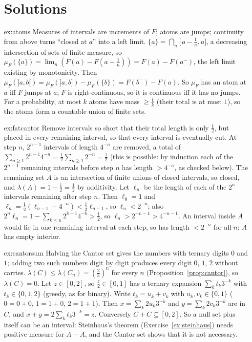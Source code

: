 \section{Solutions}

\begin{solution}{ex:atoms}
\idea Measures of intervals are increments of $F$; atoms are jumps; continuity from above turns ``closed at $a$'' into a left limit.
\writeup $\{a\}=\bigcap_n\,]a-\frac1n,a]$, a decreasing intersection of sets of finite measure, so $\mu_F(\{a\})=\lim_n(F(a)-F(a-\frac1n))=F(a)-F(a^-)$, the left limit existing by monotonicity.
Then $\mu_F(]a,b[)=\mu_F(]a,b])-\mu_F(\{b\})=F(b^-)-F(a)$. So $\mu_F$ has an atom at $a$ iff $F$ jumps at $a$; $F$ is right-continuous, so it is continuous iff it has no jumps. For a
probability, at most $k$ atoms have mass $\ge\frac1k$ (their total is at most $1$), so the atoms form a countable union of finite sets.
\end{solution}

\begin{solution}{ex:fatcantor}
\idea Remove intervals so short that their total length is only $\frac12$, but placed in every remaining interval, so that every interval is eventually cut.
\writeup At step $n$, $2^{n-1}$ intervals of length $4^{-n}$ are removed, a total of $\sum_{n\ge1}2^{n-1}4^{-n}=\frac12\sum_{n\ge1}2^{-n}=\frac12$ (this is possible: by induction each of the $2^{n-1}$ remaining
intervals before step $n$ has length $>4^{-n}$, as checked below). The remaining set $A$ is an intersection of finite unions of closed intervals, so closed, and $\lambda(A)=1-\frac12=\frac12$
by additivity. Let $\ell_n$ be the length of each of the $2^n$ intervals remaining after step $n$. Then $\ell_0=1$ and $\ell_n=\frac12(\ell_{n-1}-4^{-n})<\frac12\ell_{n-1}$, so $\ell_n<2^{-n}$; also
$2^n\ell_n=1-\sum_{k\le n}2^{k-1}4^{-k}>\frac12$, so $\ell_n>2^{-n-1}>4^{-n-1}$. An interval inside $A$ would lie in one remaining interval at each step, so has length $<2^{-n}$ for all $n$: $A$ has empty
interior.
\end{solution}

\begin{solution}{ex:cantorsum}
\idea Halving the Cantor set gives the numbers with ternary digits $0$ and $1$; adding two such numbers digit by digit produces every digit $0$, $1$, $2$ without carries.
\writeup $\lambda(C)\le\lambda(C_n)=(\frac23)^n$ for every $n$ (Proposition~\ref{prop:cantor}), so $\lambda(C)=0$. Let $z\in[0,2]$, so $\frac z2\in[0,1]$ has a ternary expansion $\sum_kt_k3^{-k}$ with $t_k\in\{0,1,2\}$
(greedy, as for binary). Write $t_k=u_k+v_k$ with $u_k,v_k\in\{0,1\}$ ($0=0+0$, $1=1+0$, $2=1+1$). Then $x=\sum_k2u_k3^{-k}$ and $y=\sum_k2v_k3^{-k}$ are in $C$, and $x+y=2\sum_kt_k3^{-k}=z$. Conversely
$C+C\subseteq[0,2]$. So a null set plus itself can be an interval: Steinhaus's theorem (Exercise~\ref{ex:steinhaus}) needs positive measure for $A-A$, and the Cantor set shows that
it is not necessary.
\end{solution}

